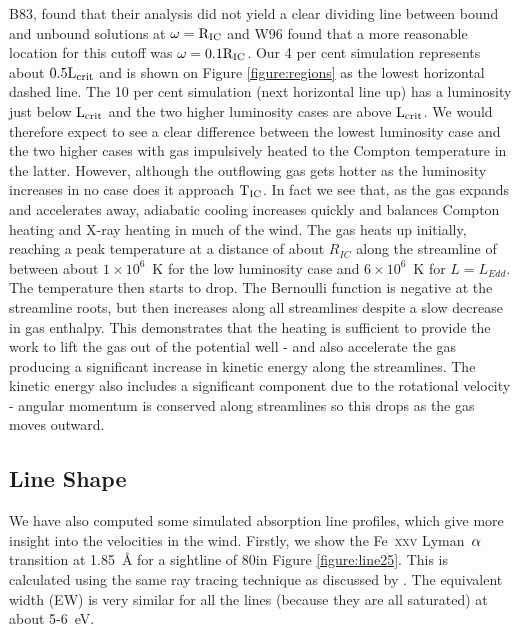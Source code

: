 \documentclass[a4paper,fleqn,usenatbib]{mnras}
\begin{document}
B83, found that their analysis did not yield a clear dividing line between bound and unbound solutions 
at $\rm{\omega=R_{IC}}$ and W96 found that a more reasonable location for this cutoff was 
$\rm{\omega=0.1 R_{IC}}$.
Our 4 per cent simulation represents about $\rm{0.5 L_{crit}}$ and is shown on Figure \ref{figure:regions} as the lowest 
horizontal dashed line. The 10 per cent simulation (next horizontal line up) has a luminosity just below $\rm{L_{crit}}$ 
and
the two higher luminosity cases are above $\rm{L_{crit}}$. We would therefore expect to see a clear difference between the lowest luminosity case and the two higher cases with gas impulsively heated to the Compton
temperature in the latter. However, although the outflowing gas gets hotter as the luminosity increases in no
case does it approach $\rm{T_{IC}}$. In fact we see that, as the gas expands and accelerates
away, adiabatic cooling increases quickly and balances Compton heating and X-ray heating in much of the wind. The gas heats up initially, reaching a peak temperature at a distance of about $R_{IC}$ along the streamline of between
about $1\times10^6$~K for the low luminosity case and $6\times10^6$~K for $L=L_{Edd}$. The temperature then starts to
drop. The Bernoulli function is negative at the streamline roots, but then
increases along all streamlines despite a slow decrease in gas enthalpy. This demonstrates that the heating is
sufficient to provide the work to lift the gas out of the potential well - and also accelerate the gas producing a
significant increase in kinetic energy along the streamlines. The kinetic energy also includes a significant component
due to the rotational velocity - angular momentum is conserved along streamlines so this drops as the gas moves 
outward.






\subsection{Line Shape}
We have also computed some simulated absorption line profiles, which give more insight into the velocities 
in the wind.
Firstly, we show the Fe~\textsc{xxv} Lyman~$\rm{\alpha}$ transition at 1.85~{\AA} for a sightline 
of 80\degree in Figure \ref{figure:line25}. This is calculated using the same ray tracing technique as discussed 
by \cite{2015ApJ...807..107H}. The equivalent width (EW) is very similar for all the lines (because they are all 
saturated) at about 5-6~eV. 
\end{document}
